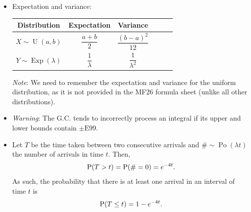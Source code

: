 \documentclass[../Notes.tex]{subfiles}
\begin{document}
\begin{stbox}{}
  \begin{itemize}
    \item Expectation and variance:
    \begin{center}
      \begin{tabular}{|Sc|Sc|Sc|}
        \hline
        Distribution & Expectation & Variance\\
        \hline
        \(X\sim \operatorname{U}(a,b)\) & \(\dfrac{a+b}{2}\) & \(\dfrac{(b-a)^2}{12}\)\\
        \hline
        \(Y\sim \operatorname{Exp}(\lambda)\) & \(\dfrac{1}{\lambda}\) & \(\dfrac{1}{\lambda^2}\)\\
        \hline
      \end{tabular} 
    \end{center}
    \emph{Note}: We need to remember the expectation and variance for the uniform distribution, as it is not provided in the MF26 formula sheet (unlike all other distributions).
    \item \emph{Warning}: The G.C. tends to incorrectly process an integral if its upper and lower bounds contain \(\pm \text{E}99\).
    \item Let \(T\) be the time taken between two consecutive arrivals and \(\#\sim\operatorname{Po}(\lambda t)\) the number of arrivals in time \(t\). Then, 
    \[\operatorname{P}(T>t)=\operatorname{P}(\#=0)=e^{-4t}.\]
    As such, the probability that there is at least one arrival in an interval of time \(t\) is 
    \[\operatorname{P}(T\leq t)=1-e^{-4t}.\]  
  \end{itemize}
\end{stbox}
\end{document}
